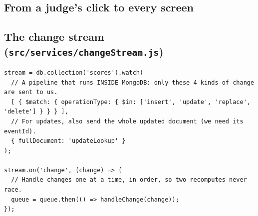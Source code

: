 \documentclass[11pt,a4paper]{article}
\newcommand{\op}[1]{\texttt{\$#1}}
\begin{document}
\subsection{From a judge's click to every screen}
\begin{center}
\end{center}

\subsection{The change stream (\texttt{src/services/changeStream.js})}
\begin{lstlisting}
stream = db.collection('scores').watch(
  // A pipeline that runs INSIDE MongoDB: only these 4 kinds of change are sent to us.
  [ { $match: { operationType: { $in: ['insert', 'update', 'replace', 'delete'] } } } ],
  // For updates, also send the whole updated document (we need its eventId).
  { fullDocument: 'updateLookup' }
);

stream.on('change', (change) => {
  // Handle changes one at a time, in order, so two recomputes never race.
  queue = queue.then(() => handleChange(change));
});
\end{lstlisting}
\end{document}
